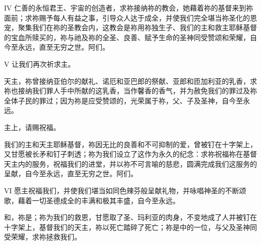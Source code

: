 \par

IV 仁善的永恒君王、宇宙的创造者，求祢接纳祢的教会，她藉着祢的基督来到祢面前；求祢赐予每人有益之事，引导众人达于成全，并使我们完全堪当祢圣化的恩宠，聚集我们在祢的圣教会内，这教会是祢用祢独生子、我们的主和救主耶稣基督的宝血所赎买的，祢与祂及祢的全圣、良善、赋予生命的圣神同受赞颂和荣耀，自今至永远，直至无穷之世。阿们。\par

\par

V 让我们再次祈求主。\par

\par

天主，祢曾接纳亚伯尔的献礼、诺厄和亚巴郎的祭献、亚郎和匝加利亚的乳香，求祢也接纳我们罪人手中所献的这乳香，当作馨香的香气，并为赦免我们的罪过及祢全体子民的罪过；因为祢是应受赞颂的，光荣属于祢，父、子及圣神，自今至永远。\par

\par

主上，请赐祝福。\par

\par

我们的主和天主耶稣基督，祢因无比的良善和不可抑制的爱，曾被钉在十字架上，又甘愿被长矛和钉子刺透；祢为我们设立了这作为永久的纪念：求祢祝福祢在基督天主内的服务，祝福我们的进堂，并以祢不可言喻的慈悲，圆满完成我们这服务的呈献，自今至永远，直至无穷之世。阿们。\par

\par

VI 愿主祝福我们，并使我们堪当如同色辣芬般呈献礼物，并咏唱神圣的不断颂歌，藉着一切圣德成全的丰满和极其丰盛，自今至永远。\par

\par

和，祢是；祢为我们的救恩，甘愿取了圣、玛利亚的肉身，不变地成了人并被钉在十字架上，基督我们的天主，祢以死亡踏碎了死亡；祢是中的一位，与父及圣神同受荣耀，求祢拯救我们。\par

